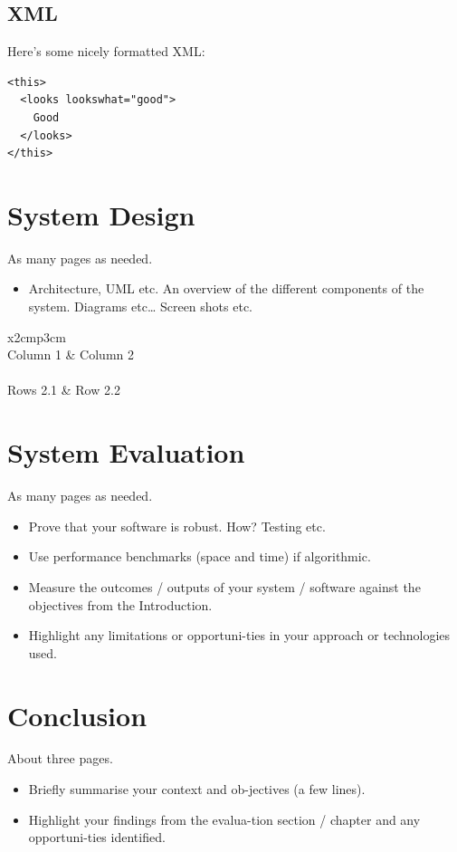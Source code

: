 	




\section{XML}
Here's some nicely formatted XML:
\begin{verbatim}
<this>
  <looks lookswhat="good">
    Good
  </looks>
</this>
\end{verbatim}

\chapter{System Design}
As many pages as needed.
\begin{itemize}
\item Architecture, UML etc. An overview of the different components of the system. Diagrams etc… Screen shots etc.
\end{itemize}

\begin{table}[h]
  \centering
  \begin{tabular}{x{2cm}p{3cm}}
    \toprule \\
    Column 1 & Column 2 \\
    \midrule \\
    Rows 2.1 & Row 2.2 \\
    \bottomrule
  \end{tabular}
  \caption{A table.}
  \label{table:mytable}
\end{table}

\chapter{System Evaluation}
As many pages as needed.
\begin{itemize}
\item Prove that your software is robust. How? Testing etc. 
\item Use performance benchmarks (space and time) if algorithmic.
\item Measure the outcomes / outputs of your system / software against the objectives from the Introduction.
\item Highlight any limitations or opportuni-ties in your approach or technologies used.
\end{itemize}

\chapter{Conclusion}
About three pages.

\begin{itemize}
\item Briefly summarise your context and ob-jectives (a few lines).
\item Highlight your findings from the evalua-tion section / chapter and any opportuni-ties identified.
\end{itemize}

